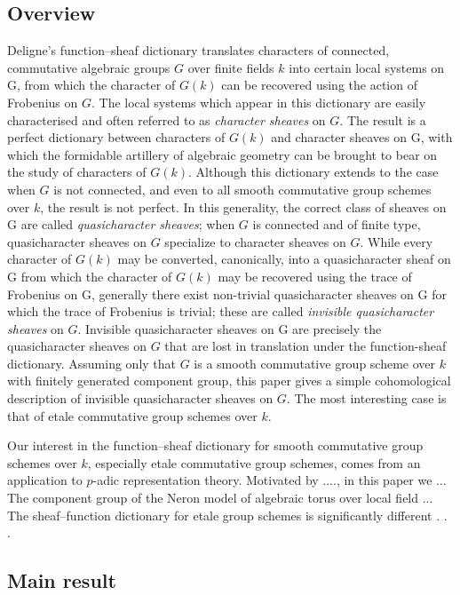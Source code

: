 \documentclass{amsart}
\theoremstyle{plain}
\theoremstyle{definition}
\theoremstyle{remark}
\newcommand{\Fq}{k}
\begin{document}
\subsection*{Overview}
Deligne's function--sheaf dictionary translates characters of connected, commutative algebraic groups $G$ over finite fields $\Fq$ into certain local systems on G, from which the character of $G(\Fq)$ can be recovered using the action of Frobenius on $G$.
The local systems which appear in this dictionary are easily characterised and often referred to as \emph{character sheaves} on $G$.
The result is a perfect dictionary between characters of $G(\Fq)$ and character sheaves on G, with which the formidable artillery of algebraic geometry can be brought to bear on the study of characters of $G(\Fq)$.
Although this dictionary extends to the case when $G$ is not connected, and even to all smooth commutative group schemes over $\Fq$, the result is not perfect.
In this generality, the correct class of sheaves on G are called \emph{quasicharacter sheaves}; when $G$ is connected and of finite type, quasicharacter sheaves on $G$ specialize to character sheaves on $G$.
While every character of $G(\Fq)$ may be converted, canonically, into a quasicharacter sheaf on G from which the character of $G(\Fq)$ may be recovered using the trace of Frobenius on G, generally there exist non-trivial quasicharacter sheaves on G for which the trace of Frobenius is trivial; these are called \emph{invisible quasicharacter sheaves} on $G$.
Invisible quasicharacter sheaves on G are precisely the quasicharacter sheaves on $G$ that are lost in translation under the function-sheaf dictionary.
Assuming only that $G$ is a smooth commutative group scheme over $\Fq$ with finitely generated component group, this paper gives a simple cohomological description of invisible quasicharacter sheaves on $G$. The most interesting case is that of etale commutative group schemes over $\Fq$.

Our interest in the function--sheaf dictionary for smooth commutative group schemes over $\Fq$, especially etale commutative group schemes, comes from an application to $p$-adic representation theory.
Motivated by ...., in this paper we ... The component group of the Neron model of algebraic torus over local field ...   The sheaf--function dictionary for etale group schemes is significantly different . . .

\subsection*{Main result}
\end{document}
